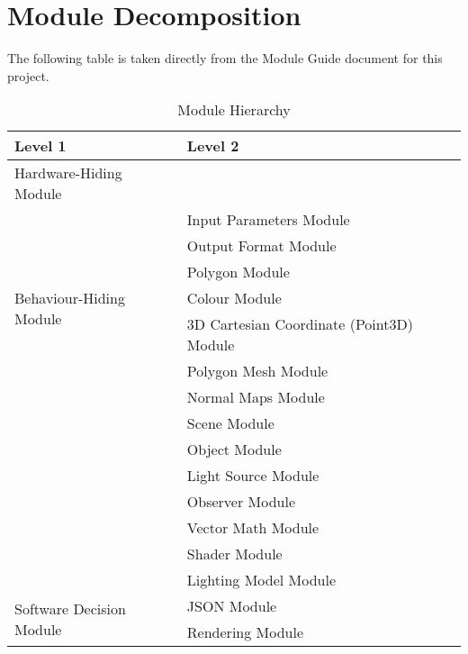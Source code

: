 \documentclass[12pt, titlepage]{article}
\begin{document}
\section{Module Decomposition}

The following table is taken directly from the Module Guide document for this project.

\begin{table}[h!]
	\centering
	\begin{tabular}{p{} p{}}
		\toprule
		\textbf{Level 1} & \textbf{Level 2}\\
		\midrule
		
		{Hardware-Hiding Module} & ~ \\
		\midrule
		
		\multirow{7}{0.3\textwidth}{Behaviour-Hiding Module} & Input Parameters 
		Module\\
		& Output Format Module \\
		& Polygon Module\\
		& Colour Module\\
		& 3D Cartesian Coordinate (Point3D) Module\\ %
		& Polygon Mesh Module\\ %
		& Normal Maps Module\\ %
		& Scene Module\\
		& Object Module\\
		& Light Source Module\\
		& Observer Module \\
		& Vector Math Module\\ %
		& Shader Module\\
		& Lighting Model Module\\
		\midrule
		\multirow{2}{0.3\textwidth}{Software Decision Module} 
		& JSON Module\\ %
		& Rendering Module\\ %
		\bottomrule
		
	\end{tabular}
	\caption{Module Hierarchy}
	\label{TblMH}
\end{table}
\end{document}

